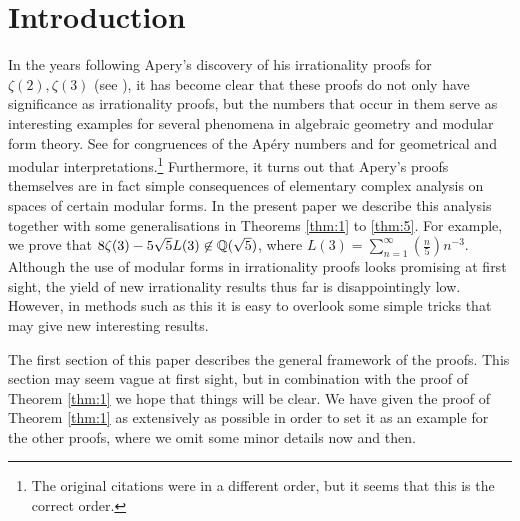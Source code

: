\section{Introduction}

In the years following Apery's discovery of his irrationality proofs for $\zeta(2), \zeta(3)$ (see \cite{van1979proof}), it has become clear that these proofs do not only have significance as irrationality proofs, but the numbers that occur in them serve as interesting examples for several phenomena in algebraic geometry and modular form theory.
See \cite{beukers1982irrationality,beukers1985some,beukers1987another,gessel1982some} for congruences of the Ap\'ery numbers and \cite{beukers1984family,stienstra1985picard} for geometrical and modular interpretations.\footnote{The original citations were in a different order, but it seems that this is the correct order.}
Furthermore, it turns out that Apery's proofs themselves are in fact simple consequences of elementary complex analysis on spaces of certain modular forms.
In the present paper we describe this analysis together with some generalisations in Theorems \ref{thm:1} to \ref{thm:5}. 
For example, we prove that $8\zeta(3) - 5 \sqrt{5} L(3) \not \in \mathbb{Q}(\sqrt{5})$, where $L(3) = \sum_{n=1}^{\infty} \left(\frac{n}{5}\right) n^{-3}$.
Although the use of modular forms in irrationality proofs looks promising at first sight, the yield of new irrationality results thus far is disappointingly low. 
However, in methods such as this it is easy to overlook some simple tricks that may give new interesting results.

The first section of this paper describes the general framework of the proofs.
This section may seem vague at first sight, but in combination with the proof of Theorem \ref{thm:1} we hope that things will be clear.
We have given the proof of Theorem \ref{thm:1} as extensively as possible in order to set it as an example for the other proofs, where we omit some minor details now and then. 
